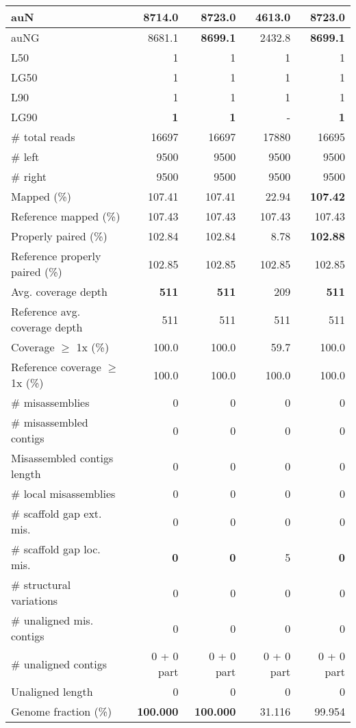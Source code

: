 \documentclass[12pt,a4paper]{article}
\begin{document}
\begin{table}[ht]
\begin{center}
\begin{tabular}{|l*{4}{|r}|}
auN & 8714.0 & {\bf 8723.0} & 4613.0 & {\bf 8723.0} \\ \hline
auNG & 8681.1 & {\bf 8699.1} & 2432.8 & {\bf 8699.1} \\ \hline
L50 & 1 & 1 & 1 & 1 \\ \hline
LG50 & 1 & 1 & 1 & 1 \\ \hline
L90 & 1 & 1 & 1 & 1 \\ \hline
LG90 & {\bf 1} & {\bf 1} & - & {\bf 1} \\ \hline
\# total reads & 16697 & 16697 & 17880 & 16695 \\ \hline
\# left & 9500 & 9500 & 9500 & 9500 \\ \hline
\# right & 9500 & 9500 & 9500 & 9500 \\ \hline
Mapped (\%) & 107.41 & 107.41 & 22.94 & {\bf 107.42} \\ \hline
Reference mapped (\%) & 107.43 & 107.43 & 107.43 & 107.43 \\ \hline
Properly paired (\%) & 102.84 & 102.84 & 8.78 & {\bf 102.88} \\ \hline
Reference properly paired (\%) & 102.85 & 102.85 & 102.85 & 102.85 \\ \hline
Avg. coverage depth & {\bf 511} & {\bf 511} & 209 & {\bf 511} \\ \hline
Reference avg. coverage depth & 511 & 511 & 511 & 511 \\ \hline
Coverage $\geq$ 1x (\%) & 100.0 & 100.0 & 59.7 & 100.0 \\ \hline
Reference coverage $\geq$ 1x (\%) & 100.0 & 100.0 & 100.0 & 100.0 \\ \hline
\# misassemblies & 0 & 0 & 0 & 0 \\ \hline
\# misassembled contigs & 0 & 0 & 0 & 0 \\ \hline
Misassembled contigs length & 0 & 0 & 0 & 0 \\ \hline
\# local misassemblies & 0 & 0 & 0 & 0 \\ \hline
\# scaffold gap ext. mis. & 0 & 0 & 0 & 0 \\ \hline
\# scaffold gap loc. mis. & {\bf 0} & {\bf 0} & 5 & {\bf 0} \\ \hline
\# structural variations & 0 & 0 & 0 & 0 \\ \hline
\# unaligned mis. contigs & 0 & 0 & 0 & 0 \\ \hline
\# unaligned contigs & 0 + 0 part & 0 + 0 part & 0 + 0 part & 0 + 0 part \\ \hline
Unaligned length & 0 & 0 & 0 & 0 \\ \hline
Genome fraction (\%) & {\bf 100.000} & {\bf 100.000} & 31.116 & 99.954 \\ \hline

\end{tabular}
\end{center}
\end{table}
\end{document}
